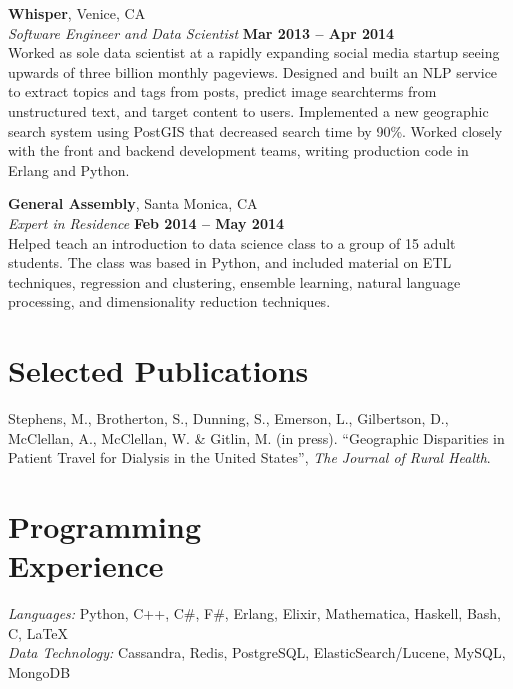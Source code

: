 \documentclass[margin,line]{resume}
\begin{document}
\begin{resume}
    \textbf{Whisper}, Venice, CA \vspace{2mm}\\\vspace{1mm}%
    \textsl{Software Engineer and Data Scientist} \hfill \textbf{Mar 2013 -- Apr 2014}\\
    Worked as sole data scientist at a rapidly expanding social media startup seeing upwards of three billion monthly pageviews. Designed and built an NLP service to extract topics and tags from posts, predict image searchterms from unstructured text, and target content to users. Implemented a new geographic search system using PostGIS that decreased search time by 90\%. Worked closely with the front and backend development teams, writing production code in Erlang and Python.

    \textbf{General Assembly}, Santa Monica, CA \vspace{2mm}\\\vspace{1mm}%
    \textsl{Expert in Residence} \hfill \textbf{Feb 2014 -- May 2014}\\
     Helped teach an introduction to data science class to a group of 15 adult students. The class was based in Python, and included material on ETL techniques, regression and clustering, ensemble learning, natural language processing, and dimensionality reduction techniques.


   \section{\mysidestyle Selected Publications}
    Stephens, M., Brotherton, S., Dunning, S., Emerson, L., Gilbertson, D., McClellan, A., McClellan, W. \& Gitlin, M. (in press). ``Geographic Disparities in Patient Travel for Dialysis in the United States'', \textsl{The Journal of Rural Health}.
\vspace{-2mm}

    \section{\mysidestyle Programming\\Experience}

    \emph{Languages:} Python, C++, C\#, F\#, Erlang, Elixir, Mathematica, Haskell, Bash, C, \LaTeX \\
    \emph{Data Technology:} Cassandra, Redis, PostgreSQL, ElasticSearch/Lucene, MySQL, MongoDB
\end{resume}
\end{document}
